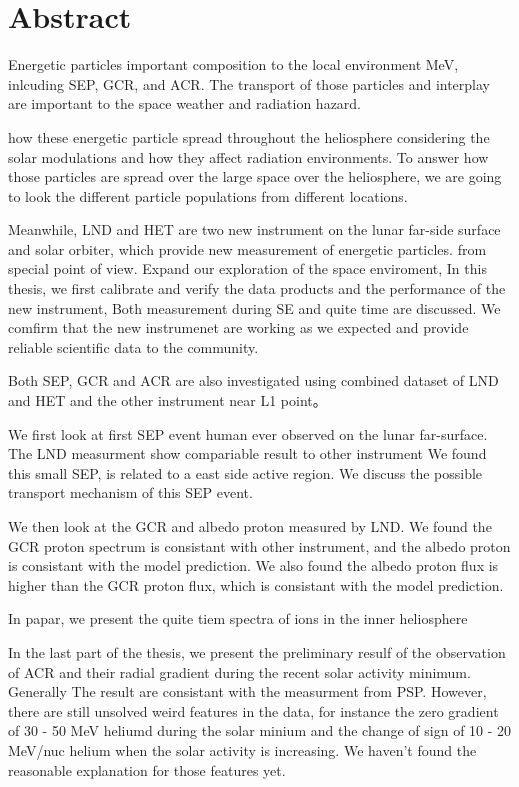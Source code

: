 \chapter*{Abstract}

Energetic particles important composition to the local environment
MeV, inlcuding SEP, GCR, and ACR. The transport of those particles and interplay are important to the space weather and radiation hazard.

how these energetic particle spread throughout the heliosphere considering the solar modulations and how they affect radiation environments.
To answer how those particles are spread over the large space over the heliosphere, we are going to look the different particle populations from different locations.

Meanwhile, LND and HET are two new instrument on the lunar far-side surface and solar orbiter, which provide new measurement of energetic particles. from special point of view. Expand our exploration of the space enviroment,
In this thesis, we first calibrate and verify the data products and the performance of the new instrument, Both measurement during \ac{SE} and quite time are discussed. We comfirm that the new instrumenet are working as we expected and provide reliable scientific data to the community.


Both SEP, GCR and ACR are also investigated using combined dataset of LND and HET and the other instrument near L1 point。

We first look at first SEP event human ever observed on the lunar far-surface. The LND measurment show compariable result to other instrument
We found this small SEP, is related to a east side active region. We discuss the possible transport mechanism of this SEP event.

We then look at the GCR and albedo proton measured by LND. We found the GCR proton spectrum is consistant with other instrument, and the albedo proton is consistant with the model prediction. We also found the albedo proton flux is higher than the GCR proton flux, which is consistant with the model prediction.

In \citet{Mason-2021-SolOQuietTime} papar, we present the quite tiem spectra of ions in the inner heliosphere

In the last part of the thesis, we present the preliminary resulf of the observation of ACR and their radial gradient during the recent solar activity minimum. Generally The result are consistant with the measurment from PSP. However, there are still unsolved weird features in the data, for instance the zero gradient of 30 - 50 MeV heliumd during the solar minium and the change of sign of 10 - 20 MeV/nuc helium when the solar activity is increasing. We haven't found the reasonable explanation for those features yet.


